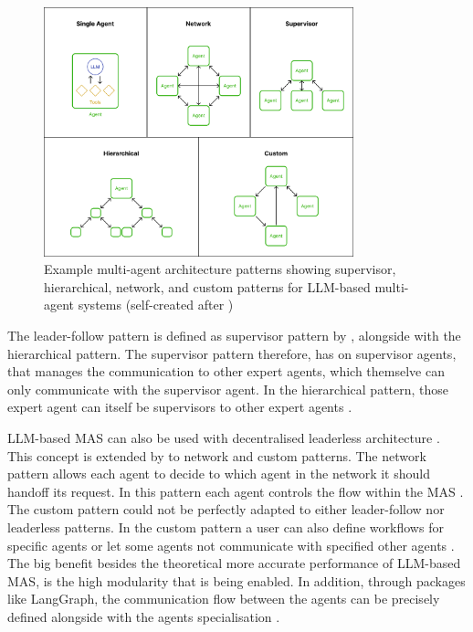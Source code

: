 \documentclass[a4paper,oneside,bibliography=totoc]{scrbook}
\begin{document}
\begin{figure}[t]
  \centering
  \includegraphics[width=0.8\textwidth]{figures/Multi-agent architectures.png}
  \caption{Example multi-agent architecture patterns showing supervisor, hierarchical, network, and custom patterns for LLM-based multi-agent systems (self-created after \cite{LangChain2025b})}
  \label{fig:mas_architecture}
\end{figure}

The leader-follow pattern is defined as supervisor pattern by \citet{LangChain2025b}, alongside with the hierarchical pattern. The supervisor pattern therefore, has on supervisor agents, that manages the communication to other expert agents, which themselve can only communicate with the supervisor agent. In the hierarchical pattern, those expert agent can itself be supervisors to other expert agents \cite{LangChain2025b}.

\ac{LLM}-based \ac{MAS} can also be used with decentralised leaderless architecture \cite{OpenAI2025,LangChain2025b}. This concept is extended by \citet{LangChain2025b} to network and custom patterns. The network pattern allows each agent to decide to which agent in the network it should handoff its request. In this pattern each agent controls the flow within the \ac{MAS} \cite{LangChain2025b,OpenAI2025}. The custom pattern could not be perfectly adapted to either leader-follow nor leaderless patterns. In the custom pattern a user can also define workflows for specific agents or let some agents not communicate with specified other agents \cite{LangChain2025b}. The big benefit besides the theoretical more accurate performance of \ac{LLM}-based \ac{MAS}, is the high modularity that is being enabled. In addition, through packages like LangGraph, the communication flow between the agents can be precisely defined alongside with the agents specialisation \cite{LangChain2025b}.
\end{document}

